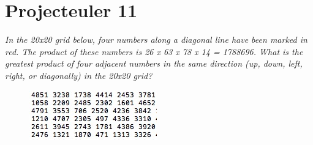 \documentclass[a4paper,11pt]{article}
\begin{document}
\section{Projecteuler 11}

\textit{In the 20x20 grid below, four numbers along a diagonal line have been marked in red. The product of these numbers is 26 x 63 x 78 x 14 = 1788696. What is the greatest product of four adjacent numbers in the same direction (up, down, left, right, or diagonally) in the 20x20 grid?}
\begin{figure}[H]
	\begin{center}
	\includegraphics[scale=0.80]{11.jpg}
	\label{11}
	\end{center}
\end{figure}
\end{document}
